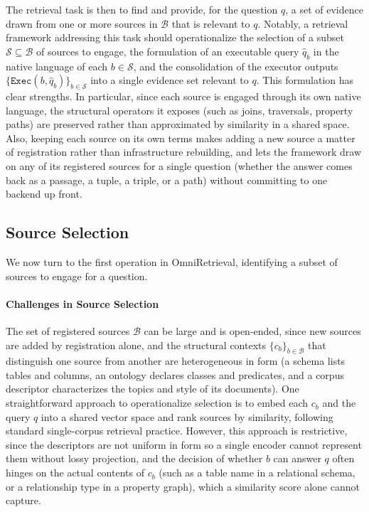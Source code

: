 \documentclass{llmxive}
\begin{document}
The retrieval task is then to find and provide, for the question $q$, a set of evidence drawn from one or more sources in $\mathcal{B}$ that is relevant to $q$. Notably, a retrieval framework addressing this task should operationalize the selection of a subset $\mathcal{S} \subseteq \mathcal{B}$ of sources to engage, the formulation of an executable query $\hat{q}_b$ in the native language of each $b \in \mathcal{S}$, and the consolidation of the executor outputs $\{\texttt{Exec}(b, \hat{q}_b)\}_{b \in \mathcal{S}}$ into a single evidence set relevant to $q$. This formulation has clear strengths. In particular, since each source is engaged through its own native language, the structural operators it exposes (such as joins, traversals, property paths) are preserved rather than approximated by similarity in a shared space. Also, keeping each source on its own terms makes adding a new source a matter of registration rather than infrastructure rebuilding, and lets the framework draw on any of its registered sources for a single question (whether the answer comes back as a passage, a tuple, a triple, or a path) without committing to one backend up front.

\subsection{Source Selection}

We now turn to the first operation in OmniRetrieval, identifying a subset of sources to engage for a question.

\paragraph{Challenges in Source Selection}
The set of registered sources $\mathcal{B}$ can be large and is open-ended, since new sources are added by registration alone, and the structural contexts $\{c_b\}_{b \in \mathcal{B}}$ that distinguish one source from another are heterogeneous in form (a schema lists tables and columns, an ontology declares classes and predicates, and a corpus descriptor characterizes the topics and style of its documents). One straightforward approach to operationalize selection is to embed each $c_b$ and the query $q$ into a shared vector space and rank sources by similarity, following standard single-corpus retrieval practice. However, this approach is restrictive, since the descriptors are not uniform in form so a single encoder cannot represent them without lossy projection, and the decision of whether $b$ can answer $q$ often hinges on the actual contents of $c_b$ (such as a table name in a relational schema, or a relationship type in a property graph), which a similarity score alone cannot capture.
\end{document}
